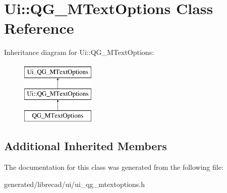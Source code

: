 \hypertarget{classUi_1_1QG__MTextOptions}{\section{Ui\-:\-:Q\-G\-\_\-\-M\-Text\-Options Class Reference}
\label{classUi_1_1QG__MTextOptions}
}
Inheritance diagram for Ui\-:\-:Q\-G\-\_\-\-M\-Text\-Options\-:\begin{figure}[H]
\begin{center}
\leavevmode
\includegraphics[height=3.000000cm]{classUi_1_1QG__MTextOptions}
\end{center}
\end{figure}
\subsection*{Additional Inherited Members}


The documentation for this class was generated from the following file\-:\begin{DoxyCompactItemize}
\item 
generated/librecad/ui/ui\-\_\-qg\-\_\-mtextoptions.\-h\end{DoxyCompactItemize}
